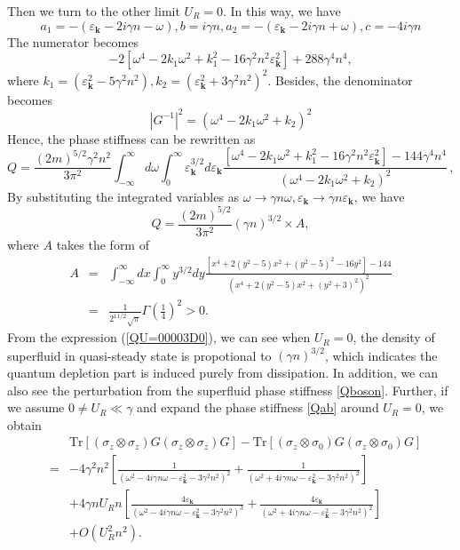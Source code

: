 \documentclass[aps,superscriptaddress,notitlepage,longbibliography]{revtex4-1}
\begin{document}
Then we turn to the other limit $U_{R}=0$. In this way, we have 
\begin{equation}
a_{1}=-(\varepsilon_{\bm{k}}-2i\gamma n-\omega),b=i\gamma n,a_{2}=-(\varepsilon_{\bm{k}}-2i\gamma n+\omega),c=-4i\gamma n
\end{equation}
The numerator becomes 
\begin{equation}
-2[\omega^{4}-2k_{1}\omega^{2}+k_{1}^{2}-16\gamma^{2}n^{2}\varepsilon_{\bm{k}}^{2}]+288\gamma^{4}n^{4},
\end{equation}
where $k_{1}=(\varepsilon_{\bm{k}}^{2}-5\gamma^{2}n^{2}),k_{2}=(\varepsilon_{\bm{k}}^{2}+3\gamma^{2}n^{2})^{2}$.
Besides, the denominator becomes 
\begin{equation}
|G^{-1}|^{2}=(\omega^{4}-2k_{1}\omega^{2}+k_{2})^{2}
\end{equation}
Hence, the phase stiffness can be rewritten as 
\begin{equation}
Q=\frac{(2m)^{5/2}\gamma^{2}n^{2}}{3\pi^{2}}\int_{-\infty}^{\infty}d\omega\int_{0}^{\infty}\varepsilon_{\bm{k}}^{3/2}d\varepsilon_{\bm{k}}\frac{[\omega^{4}-2k_{1}\omega^{2}+k_{1}^{2}-16\gamma^{2}n^{2}\varepsilon_{\bm{k}}^{2}]-144\gamma^{4}n^{4}}{(\omega^{4}-2k_{1}\omega^{2}+k_{2})^{2}}\,,
\end{equation}
By substituting the integrated variables as $\omega\rightarrow\gamma n\omega,\varepsilon_{\bm{k}}\rightarrow\gamma n\varepsilon_{\bm{k}}$,
we have 
\begin{equation}
Q=\frac{(2m)^{5/2}}{3\pi^{2}}(\gamma n)^{3/2}\times A,\label{QU=00003D0}
\end{equation}
where $A$ takes the form of 
\begin{eqnarray*}
A & = & \int_{-\infty}^{\infty}dx\int_{0}^{\infty}y^{3/2}dy\frac{[x^{4}+2(y^{2}-5)x^{2}+(y^{2}-5)^{2}-16y^{2}]-144}{(x^{4}+2(y^{2}-5)x^{2}+(y^{2}+3)^{2})^{2}}\\
 & = & \frac{1}{2^{11/2}\sqrt{\pi}}\Gamma\left(\frac{1}{4}\right)^{2}>0.
\end{eqnarray*}
From the expression (\ref{QU=00003D0}), we can see when $U_{R}=0$,
the density of superfluid in quasi-steady state is propotional to
$(\gamma n)^{3/2}$, which indicates the quantum depletion part is
induced purely from dissipation. In addition, we can also see the
perturbation from the superfluid phase stiffness \eqref{Qboson}.
Further, if we assume $0\neq U_{R}\ll\gamma$ and expand the phase
stiffness \eqref{Qab} around $U_{R}=0$, we obtain 
\begin{eqnarray}
 &  & \text{Tr}[(\sigma_{z}\otimes\sigma_{z})G(\sigma_{z}\otimes\sigma_{z})G]-\text{Tr}[(\sigma_{z}\otimes\sigma_{0})G(\sigma_{z}\otimes\sigma_{0})G]\nonumber \\
 & = & -4\gamma^{2}n^{2}\left[\frac{1}{(\omega^{2}-4i\gamma n\omega-\varepsilon_{\bm{k}}^{2}-3\gamma^{2}n^{2})^{2}}+\frac{1}{(\omega^{2}+4i\gamma n\omega-\varepsilon_{\bm{k}}^{2}-3\gamma^{2}n^{2})^{2}}\right]\nonumber \\
 &  & +4\gamma nU_{R}n\left[\frac{4\varepsilon_{\bm{k}}}{(\omega^{2}-4i\gamma n\omega-\varepsilon_{\bm{k}}^{2}-3\gamma^{2}n^{2})^{3}}+\frac{4\varepsilon_{\bm{k}}}{(\omega^{2}+4i\gamma n\omega-\varepsilon_{\bm{k}}^{2}-3\gamma^{2}n^{2})^{2}}\right]\nonumber \\
 &  & +O(U_{R}^{2}n^{2}).
\end{eqnarray}
\end{document}
